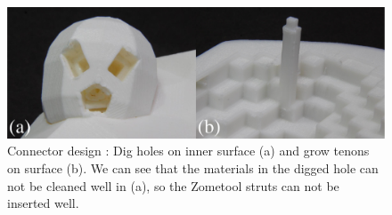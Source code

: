     
\begin{figure}[ht]
\centering
\includegraphics[width=1.0\linewidth]{figs/surface_connection.pdf} 
\caption{
Connector design : Dig holes on inner surface (a) and grow tenons on surface (b).
We can see that the materials in the digged hole can not be cleaned well in (a), so the Zometool struts can not be inserted well.
}
\label{fig:exp_connector}
\end{figure}

